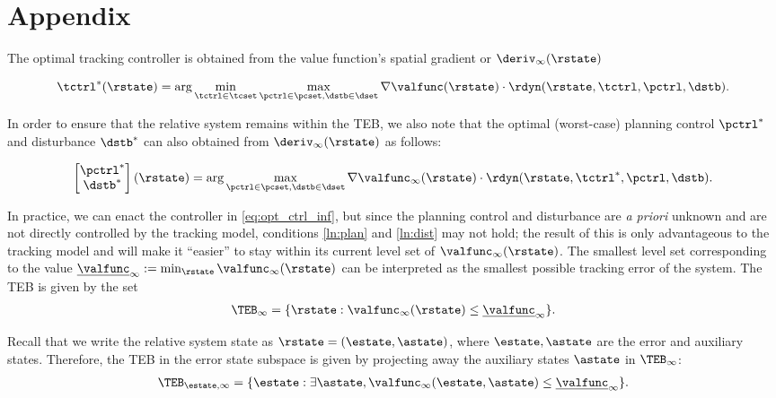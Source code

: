 \section*{Appendix}

The optimal tracking controller is obtained from the value function's spatial gradient
or $\deriv_\infty(\rstate)$

\begin{align} \label{eq:opt_ctrl_inf}
\tctrl^*(\rstate) = \arg\min_{\tctrl\in\tcset} \max_{\pctrl\in\pcset, \dstb\in\dset} \nabla\valfunc(\rstate) \cdot \rdyn(\rstate,\tctrl,\pctrl,\dstb). 
\end{align}

In order to ensure that the relative system remains within the TEB, we also note that the optimal (worst-case) planning control $\pctrl^*$ and disturbance $\dstb^*$ can also obtained from $\deriv_\infty(\rstate)$ as follows:

\begin{align} \label{eq:opt_dstb_inf}
\begin{bmatrix}
\pctrl^* \\
\dstb^*
\end{bmatrix}(\rstate) = \arg \max_{\pctrl\in\pcset, \dstb\in\dset} \nabla\valfunc_\infty(\rstate) \cdot \rdyn(\rstate,\tctrl^*,\pctrl,\dstb). 
\end{align}

In practice, we can enact the controller in \eqref{eq:opt_ctrl_inf}, but since the planning control and disturbance are \textit{a priori} unknown and are not directly controlled by the tracking model, conditions \ref{ln:plan} and \ref{ln:dist} may not hold; the result of this is only advantageous to the tracking model and will make it ``easier'' to stay within its current level set of  $\valfunc_\infty(\rstate)$. 
The smallest level set corresponding to the value $\underline\valfunc_\infty := \min_{\rstate} \valfunc_\infty(\rstate)$ can be interpreted as the smallest possible tracking error of the system. 
The TEB is given by the set 
  \begin{align} \label{eq:TEB_inf}
  \TEB_\infty = \{\rstate: \valfunc_\infty(\rstate) \le \underline\valfunc_\infty\}.
  \end{align}

Recall that we write the relative system state as $\rstate = (\estate, \astate)$, where $\estate,\astate$ are the error and auxiliary states.
Therefore, the TEB in the error state subspace is given by projecting away the auxiliary states $\astate$ in  $\TEB_\infty$:
  \begin{align}  \label{eq:TEBp_inf}
  \TEB_{\estate, \infty} = \{\estate: \exists \astate, \valfunc_\infty(\estate, \astate) \le \underline\valfunc_\infty\}. 
  \end{align}

